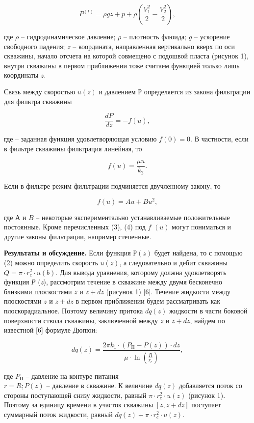 \begin{multicols}{2}
\begin{equation}
P^{(t)}=\rho gz+p+\rho\left(\frac{V_1^2}{2}-\frac{V_2^2}{2}\right),
\end{equation}

где $\rho$ -- гидродинамическое давление; $\rho$ -- плотность
флюида; $g$ -- ускорение свободного падения; $z$ --
координата, направленная вертикально вверх по оси скважины, начало
отсчета на которой совмещено с подошвой пласта (рисунок 1), внутри
скважины в первом приближении тоже считаем функцией только лишь
координаты $z$.

Связь между скоростью $u(z)$ и давлением $Р$ определяется из
закона фильтрации для фильтра скважины

\begin{equation}
\frac{dP}{dz}=-f(u),
\end{equation}

где 
-- заданная функция удовлетворяющая условию $f(0)=0$. В частности,
если в фильтре скважины фильтрация линейная, то

\begin{equation}
f(u)=\frac{\mu u}{k_2}.
\end{equation}

Если в фильтре режим фильтрации подчиняется двучленному закону, то

\begin{equation}
f(u)=Au+Bu^2,
\end{equation}

где $А$ и $B$ -- некоторые экспериментально устанавливаемые
положительные постоянные. Кроме перечисленных (3), (4) под $f$
$(u)$ могут пониматься и другие законы фильтрации, например
степенные.

{\bfseries Результаты и обсуждение.} Если функция $Р(z)$ будет
найдена, то с помощью (2) можно определить скорость $u(z)$,
а следовательно и дебит скважины $Q=\pi\cdot r_c^2\cdot u(b)$. Для
вывода уравнения, которому должна удовлетворять функция \emph{Р}
(\emph{z}), рассмотрим течение в скважине между двумя бесконечно
близкими плоскостями $z$ и $z+dz$ (рисунок 1) {[}6{]}. Течение
жидкости между плоскостями $z$ и $z+dz$ в первом приближении
будем рассматривать как плоскорадиальное. Поэтому величину притока
$dq(z)$ жидкости в части боковой поверхности ствола
скважины, заключенной между $z$ и $z+dz$, найдем по
известной {[}6{]} формуле Дюпюи:

\begin{equation}
dq(z)=\frac{2\pi k_1\cdot(P_{\text{П}}-P(z))\cdot dz}{\mu\cdot \ln\left(\frac{R}{r_c}\right)},
\end{equation}

где $P_{\text{П}}$ -- давление на контуре питания \\$r=R; P(z)$ --
давление в скважине. К величине $dq(z)$ добавляется поток
со стороны поступающей снизу жидкости, равный $\pi\cdot r_c^2\cdot
u(z)$ (рисунок 1). Поэтому за единицу времени в участок скважины
$[z,z+dz]$ поступает суммарный поток жидкости, равный $dq(z)+\pi\cdot r_c^2\cdot u(z)$.
\end{multicols}


